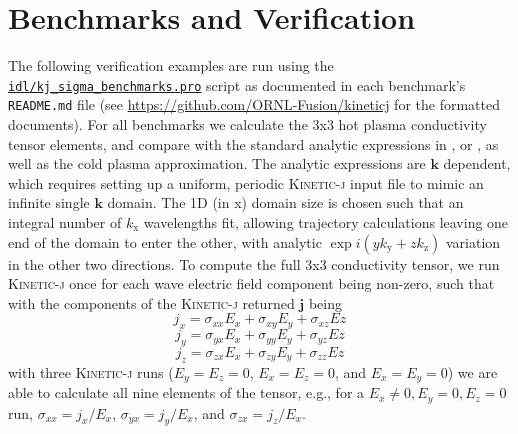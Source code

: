 \documentclass[final,5p,times,twocolumn]{elsarticle}
\renewcommand{\vec}[1]{\mathbf{#1}}
\newcommand{\kj}{\textsc{Kinetic-j}\xspace}
\begin{document}
\section{Benchmarks and Verification}
\label{section:verification}
The following verification examples are run using the \href{https://github.com/ORNL-Fusion/kineticj/blob/master/idl/kj_sigma_benchmarks.pro}{\texttt{idl/kj\_sigma\_benchmarks.pro}} script as documented in each benchmark's \texttt{README.md} file (see \url{https://github.com/ORNL-Fusion/kineticj} for the formatted documents).
%
For all benchmarks we calculate the 3x3 hot plasma conductivity tensor elements, and compare with the standard analytic expressions in \cite[pg. 255 of ][]{brambilla}, or \cite[pg. 176 of][]{swanson}, as well as the cold plasma approximation. The analytic expressions are $\vec{k}$ dependent, which requires setting up a uniform, periodic \kj input file to mimic an infinite single $\vec{k}$ domain. The 1D (in x) domain size is chosen such that an integral number of $k_{\mathrm{x}}$ wavelengths fit, allowing trajectory calculations leaving one end of the domain to enter the other, with analytic $\exp{i\left(yk_{\mathrm{y}}+zk_{\mathrm{z}}\right)}$ variation in the other two directions. To compute the full 3x3 conductivity tensor, we run \kj once for each wave electric field component being non-zero, such that with the components of the \kj returned $\vec{j}$ being 
%
\begin{equation} 
j_x = \sigma_{xx}E_x+\sigma_{xy}E_y+\sigma_{xz}Ez
\end{equation}
\begin{equation} 
j_y = \sigma_{yx}E_x+\sigma_{yy}E_y+\sigma_{yz}Ez
\end{equation}
\begin{equation} 
j_z = \sigma_{zx}E_x+\sigma_{zy}E_y+\sigma_{zz}Ez
\end{equation}
%
with three \kj runs ($E_y=E_z=0$, $E_x=E_z=0$, and $E_x=E_y=0$) we are able to calculate all nine elements of the tensor, e.g., for a $E_x\ne0,E_y=0,E_z=0$ run, $\sigma_{xx}=j_x/E_x$, $\sigma_{yx}=j_y/E_x$, and $\sigma_{zx}=j_z/E_x$. 
%
\end{document}
